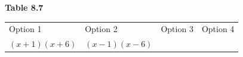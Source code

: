 {{\begin{center}
\begin{tabular}[t]{|l|l|l|l|}
     \tabularnewline\cline{1-1}\cline{2-2}\cline{3-3}\cline{4-4}
    \end{tabular}
      \end{center}
    \begin{center}{\small\bfseries Table 8.7}\end{center}
          }{ %
        \begin{center}
      \label{m39394*id276099}
    \noindent
      \tablelasttail{}
      \begin{xtabular}[t]{|l|l|l|l|}\hline
        Option 1 &
        Option 2 &
        Option 3 &
        Option 4%
     \tabularnewline{}
                $\left(x+1\right)\left(x+6\right)$
               &
                $\left(x-1\right)\left(x-6\right)$
               &

\end{xtabular}
\end{center}}}

